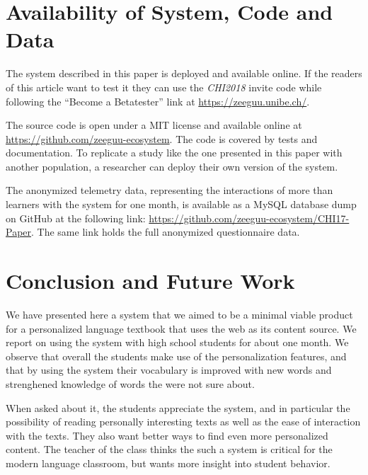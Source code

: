 \section{Availability of System, Code and Data}

The system described in this paper is deployed and available online. If the readers of this article want to test it they can use the {\em CHI2018} invite code while following the  ``Become a Betatester'' link at \url{https://zeeguu.unibe.ch/}.

The source code is open under a MIT license and available online at \url{https://github.com/zeeguu-ecosystem}. The code is covered by tests and documentation. To replicate a study like the one presented in this paper with another population, a researcher can deploy their own version of the system. 

The anonymized telemetry data, representing the interactions of more than \students learners with the system for one month, is available as a MySQL database dump on GitHub at the following link: \url{https://github.com/zeeguu-ecosystem/CHI17-Paper}. The same link holds the full anonymized questionnaire data. %





\section{Conclusion and Future Work}
We have presented here a system that we aimed to be a minimal viable product for a personalized language textbook that uses the web as its content source. We report on using the system with high school students for about one month. We observe that overall the students make use of the personalization features, and that by using the system their vocabulary is improved with new words and strenghened knowledge of words the were not sure about. 

When asked about it, the students appreciate the system, and in particular the possibility of reading personally interesting texts as well as the ease of interaction with the texts. They also want better ways to find even more personalized content. The teacher of the class thinks the such a system is critical for the modern language classroom, but wants more insight into student behavior.


